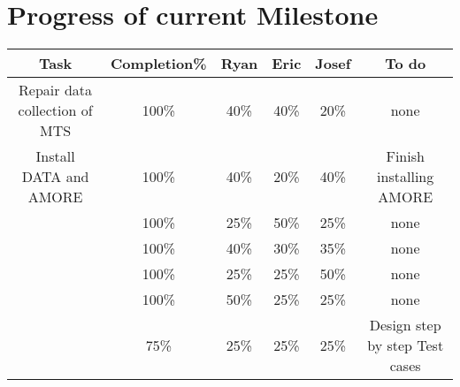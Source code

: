 \documentclass[12pt]{article}
\begin{document}
\section{Progress of current Milestone}
\begin{adjustwidth}{-2cm}{}
\begin{tabular}{|c|c|c|c|c|c|}
\hline
Task & Completion\% & Ryan & Eric & Josef & To do \\
\hline
Repair data collection of MTS & 100\% & 40\% & 40\% & 20\% & none \\
\hline
Install DATA and AMORE & 100\% & 40\% & 20\% & 40\% & Finish installing AMORE \\
\hline
 & 100\% & 25\% & 50\% & 25\% & none \\
 \hline
 & 100\% & 40\% & 30\% & 35\% & none \\
 \hline
  & 100\% & 25\% & 25\% & 50\% & none \\
  \hline
   & 100\% & 50\% & 25\% & 25\% & none \\
   \hline
   & 75\% & 25\% & 25\% & 25\% & Design step by step Test cases \\
   \hline
   
\end{tabular}
\end{adjustwidth}
\end{document}
